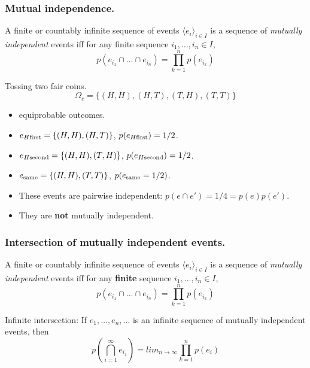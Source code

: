 \documentclass{beamer}
\begin{document}
\begin{frame}
  \frametitle{Mutual independence.}
  A finite or countably infinite sequence of events $\langle e_i \rangle_{i \in I}$ is a sequence of \emph{mutually independent} events iff for any finite sequence $i_1, \dots, i_n \in I$,
  \[p(e_{i_1} \cap \dots \cap e_{i_n}) = \prod^n_{k=1} p(e_{i_k})\]
\end{frame}

\begin{frame}
  \begin{exampleblock}{Tossing two fair coins.}
    \[\Omega_{c} = \{ (H,H), (H, T), (T, H), (T, T) \} \]
    \begin{itemize}
    \item equiprobable outcomes.
    \item $e_{H \textnormal{first}} = \{(H,H), (H,T)\}$, $p(e_{H \textnormal{first}}) = 1/2$.
    \item $e_{H \textnormal{second}} = \{(H,H), (T,H)\}$, $p(e_{H \textnormal{second}}) = 1/2$.
    \item $e_{\textnormal{same}} = \{(H,H), (T,T)\}$, $p(e_{\textnormal{same}} = 1/2)$.
    \item These events are pairwise independent: $p(e \cap e') = 1/4 = p(e)p(e')$.
    \item They are \textbf{not} mutually independent.
    \end{itemize}
  \end{exampleblock}
\end{frame}
    

\begin{frame}
  \frametitle{Intersection of mutually independent events.}
  A finite or countably infinite sequence of events $\langle e_i \rangle_{i \in I}$ is a sequence of \emph{mutually independent} events iff for any \textbf{finite} sequence $i_1, \dots, i_n \in I$,
  \[p(e_{i_1} \cap \dots \cap e_{i_n}) = \prod^n_{k=1} p(e_{i_k})\]

  \begin{block}{Infinite intersection:}
    If $e_1, \dots, e_n, \dots$ is an infinite sequence of mutually independent events, then
    \[p(\bigcap^{\infty}_{i=1} e_{i_1} ) = lim_{n \rightarrow \infty} \prod^{n}_{k=1} p(e_{i})\]
  \end{block}
  
\end{frame}
\end{document}
